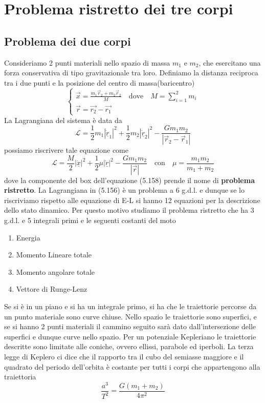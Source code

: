 \section{Problema ristretto dei tre corpi}
\subsection{Problema dei due corpi}
Consideriamo 2 punti materiali nello spazio di massa $m_1$ e $m_2$, che esercitano una forza conservativa di tipo gravitazionale tra loro. 
Definiamo la distanza reciproca tra i due punti e la posizione del centro di massa(baricentro)
\begin{equation}
\left\{\begin{array}{l}
\vec{x}=\frac{m_1 \vec{r}_2+m_2 \vec{r}_2}{M} \quad \text{dove} \quad M = \sum_{i=1}^{2}m_{i} \\
\vec{r}=\vec{r_2}-\vec{r_1}
\end{array}\right.
\end{equation}
La Lagrangiana del sistema \`{e} data da 
\begin{equation}
	\mathcal{L} = \frac{1}{2}m_{1}|\dot{\underline{r}}_1|^2 + \frac{1}{2}m_{2}|\dot{\underline{r}}_2|^2 - \frac{Gm_1m_2}{|\vec{r}_2 - \vec{r}_1|}
\end{equation}
possiamo riscrivere tale equazione come 
\begin{equation}
	\mathcal{L} = \frac{M}{2}|\dot{\underline{x}}|^2 + \boxed{\frac{1}{2}\mu |\dot{\underline{r}}|^2 - \frac{G m_1 m_2}{|\vec{r}|}} \quad \text{con} \quad \mu = \frac{m_1m_2}{m_1 + m_2}
\end{equation}
dove la componente del box dell'equazione (5.158) prende il nome di \textbf{problema ristretto}. La Lagrangiana in (5.156) \`{e} un problema a 6 g.d.l. e dunque se lo riscriviamo rispetto alle equazione di E-L si hanno 12 equazioni per la descrizione dello stato dinamico. Per questo motivo studiamo il problema ristretto che ha 3 g.d.l. e 5 integrali primi e le seguenti costanti del moto
\begin{enumerate}
	\item Energia
	\item Momento Lineare totale
	\item Momento angolare totale
	\item Vettore di Runge-Lenz
\end{enumerate} 
Se si \`{e} in un piano e si ha un integrale primo, si ha che le traiettorie percorse da un punto materiale sono curve chiuse. Nello spazio le traiettorie sono superfici, e se si hanno 2 punti materiali il cammino seguito sar\`{a} dato dall'intersezione delle superfici e dunque curve nello spazio.\newline
\noindent Per un potenziale Kepleriano le traiettorie descritte sono limitate alle coniche, ovvero ellissi, parabole ed iperboli. La terza legge di Keplero ci dice che il rapporto tra il cubo del semiasse maggiore e il quadrato del periodo dell'orbita \`{e} costante per tutti i corpi che appartengono alla traiettoria
\begin{equation}
	\frac{a^3}{T^2} = \frac{G(m_1+m_2)}{4 \pi^2}
\end{equation}
